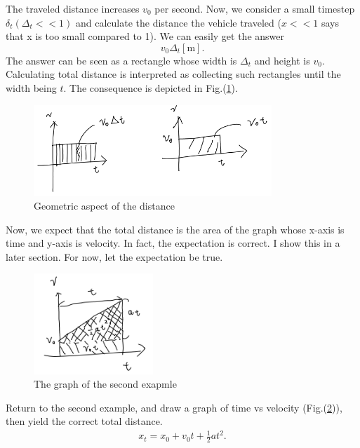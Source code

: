 \documentclass[pdflatex,sn-mathphys-num]{sn-jnl}%
\theoremstyle{thmstyleone}%
\theoremstyle{thmstyletwo}%
\theoremstyle{thmstylethree}%
\begin{document}
The traveled distance increases $v_0$ per second. Now, we consider a small timestep $\delta_t (\Delta_t << 1)$ and calculate the distance the vehicle traveled ($x << 1$ says that x is too small compared to 1).
We can easily get the answer
\begin{equation}
	v_0 \Delta_t \mathrm{[m]} .
\end{equation}
The answer can be seen as a rectangle whose width is $\Delta_t$ and height is $v_0$. Calculating total distance is interpreted as collecting such rectangles until the width being $t$.
The consequence is depicted in Fig.(\ref{geoDist}).
\begin{figure}[H]
	\centering
	\includegraphics[width=0.8\textwidth]{images/geoDist.png}
	\caption{Geometric aspect of the distance}
	\label{geoDist}
\end{figure}

Now, we expect that the total distance is the area of the graph whose x-axis is time and y-axis is velocity. In fact, the expectation is correct. I show this in a later section. For now, let the expectation be true.

\begin{figure}[H]
	\centering
	\includegraphics[width=0.4\textwidth]{images/x_v_aGraph.png}
	\caption{The graph of the second exapmle}
	\label{x_v_a}
\end{figure}

Return to the second example, and draw a graph of time vs velocity (Fig.(\ref{x_v_a})), then yield the correct total distance.
\begin{eqnarray}
	x_t = x_0 + v_0 t + \frac{1}{2} a t^2 .
\end{eqnarray}
\end{document}
